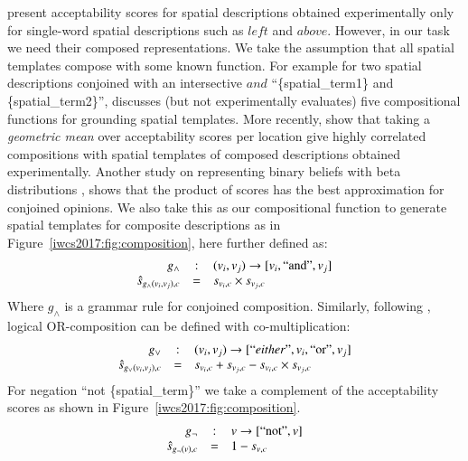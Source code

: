 \cite{logan1996computational} present acceptability scores for spatial
descriptions obtained experimentally only for single-word spatial descriptions
such as $left$ and $above$. However, in our task we need their composed
representations.
We take the assumption that all spatial templates compose with some known
function. For example for two spatial descriptions conjoined with an
intersective $and$ ``\{spatial\_term1\} and \{spatial\_term2\}'',
\cite{Gapp:1994:CompositeRelations} discusses (but not experimentally evaluates) five compositional functions for grounding spatial templates. More recently, \cite{Dobnik:2017ac} show that taking a
\emph{geometric mean} over acceptability scores per location give highly
correlated compositions with spatial templates of composed descriptions obtained
experimentally. Another study on representing binary beliefs with beta
distributions \cite{josang2005multiplication}, shows that the product of scores 
has the best approximation for conjoined opinions. We also take this as our
compositional function to generate spatial templates for composite descriptions
as in Figure~\ref{iwcs2017:fig:composition}, here further defined as:
\begin{equation}\begin{array}{r c l}
g_\land &:& (v_i, v_j) \to[v_i,``\mathrm{and}",v_j] \\
\hat{s}_{g_\land(v_i,v_j),c} &=& s_{v_i, c} \times s_{v_j, c}
\end{array}
\end{equation}
\noindent Where $g_\land$ is a grammar rule for conjoined composition. Similarly, following \cite{josang2005multiplication}, logical OR-composition can be defined with
co-multiplication:
\begin{equation}\begin{array}{r c l}
g_\lor &:& (v_i, v_j) \to [``either",v_i,``\mathrm{or}",v_j] \\
\hat{s}_{g_\lor(v_i,v_j),c} &=& s_{v_i, c} + s_{v_j, c} - s_{v_i, c} \times s_{v_j, c}
\end{array}
\end{equation}
\noindent For negation ``not \{spatial\_term\}'' we take a complement of the acceptability
scores as shown in Figure~\ref{iwcs2017:fig:composition}.
\begin{equation}\begin{array}{r c l}
g_\neg &:& v \to [``\mathrm{not}",v] \\
\hat{s}_{g_\neg(v),c} &=& 1 - s_{v, c}
\end{array}
\end{equation}
